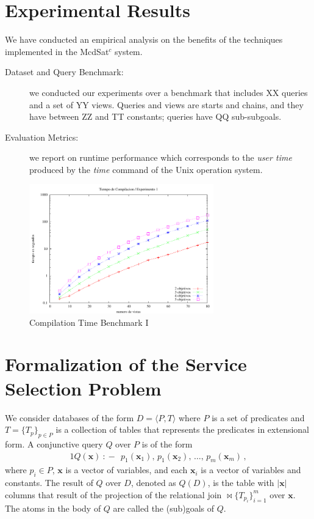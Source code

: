 \documentclass{llncs}
\newcommand{\tup}[1]{\langle #1 \rangle}
\newcommand{\vvec}[1]{\mathbf{#1}}
\newcommand{\join}{\bowtie}
\newcommand{\qrule}{:\!\!-}
\begin{document}
\section{Experimental Results}
We have conducted an empirical analysis  on the benefits of the techniques implemented in the   McdSat$^c$ system.

\begin{description}
\item[Dataset and Query Benchmark:]  we conducted our experiments over a benchmark that includes XX queries and a set of  YY views. Queries and views are starts and chains, and they have between ZZ and TT constants; queries have QQ sub-subgoals.
\item[Evaluation Metrics:] we report on runtime performance which corresponds to the  {\it user time} produced by the {\it time} command of the Unix operation system. 
\end{description}
 
\begin{figure}
\centering
\includegraphics[width=8cm]{plot1.pdf}
\caption{Compilation Time Benchmark I}
\label{fig:plot1}
\end{figure}


\section{Formalization of the Service Selection Problem}

We consider databases of the form $D=\tup{P,T}$ where
$P$ is a set of predicates and $T=\{T_p\}_{p\in P}$ is a collection
of tables that represents the predicates in extensional form.
A conjunctive query $Q$ over $P$ is of the form 
\begin{alignat*}{1}
Q(\vvec{x})\ \qrule\ \  p_1(\vvec{x}_1),\, p_1(\vvec{x}_2),\, \ldots,\, p_m(\vvec{x}_m)\,,
\end{alignat*}
where $p_i\in P$, $\vvec{x}$ is a vector of variables, and each
$\vvec{x}_i$ is a vector of variables and constants.
The result of $Q$ over $D$, denoted as $Q(D)$, is the table with
$|\vvec{x}|$ columns that result of the projection of the relational
join $\join\!\!\{T_{p_i}\}_{i=1}^m$ over $\vvec{x}$.
The atoms in the body of $Q$ are called the (sub)goals of $Q$.
\end{document}
